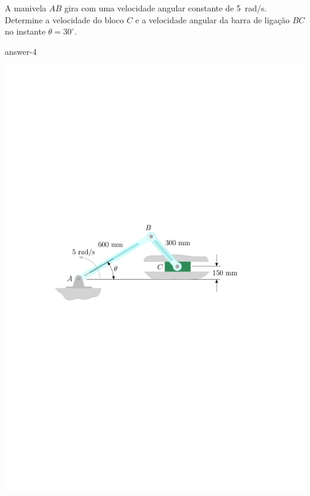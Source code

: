 \item A manivela $AB$ gira com uma velocidade angular constante de \SI{5}{\radian/\second}. Determine a velocidade do bloco $C$ e a velocidade angular da barra de ligação $BC$ no instante $\theta=30^{\circ}$.

{answer-4}

\vspace{-2cm}
\begin{flushright}
	\includegraphics[scale=.9]{images/draw_3}
\end{flushright}